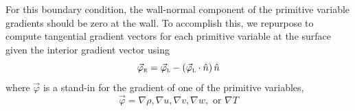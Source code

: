 
For this boundary condition, the wall-normal component of the primitive variable
gradients should be zero at the wall.
%
To accomplish this, we repurpose  to compute
tangential gradient vectors for each primitive variable at the surface given the
interior gradient vector using
%
\begin{equation*}
  \vec{\varphi}_{\textsc{r}} = \vec{\varphi}_{\textsc{l}}
                   - \left(\vec{\varphi}_{\textsc{l}}\cdot\hat{n}\right)\hat{n}
\end{equation*}
%
where $\vec{\varphi}$ is a stand-in for the gradient of one of the primitive
variables, \thatis \[\vec{\varphi} = \nabla\rho, \nabla u, \nabla v, \nabla w,
\text{ or } \nabla T\]



